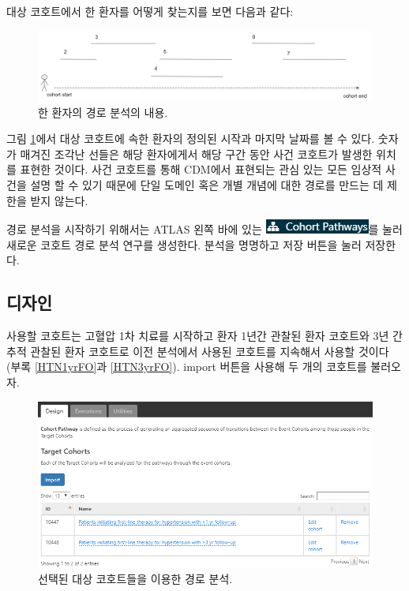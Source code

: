 \documentclass[11pt]{book}
\theoremstyle{definition}
\theoremstyle{definition}
\theoremstyle{definition}
\theoremstyle{remark}
\begin{document}
대상 코호트에서 한 환자를 어떻게 찾는지를 보면 다음과 같다:

\begin{figure}

{\centering \includegraphics[width=1\linewidth]{images/Characterization/pathwaysPersonEventView} 

}

\caption{한 환자의 경로 분석의 내용.}\label{fig:pathwaysPersonEventView}
\end{figure}

그림 \ref{fig:pathwaysPersonEventView}에서 대상 코호트에 속한 환자의
정의된 시작과 마지막 날짜를 볼 수 있다. 숫자가 매겨진 조각난 선들은 해당
환자에게서 해당 구간 동안 사건 코호트가 발생한 위치를 표현한 것이다.
사건 코호트를 통해 CDM에서 표현되는 관심 있는 모든 임상적 사건을 설명 할
수 있기 때문에 단일 도메인 혹은 개별 개념에 대한 경로를 만드는 데 제한을
받지 않는다.

경로 분석을 시작하기 위해서는 ATLAS 왼쪽 바에 있는
\includegraphics{images/Characterization/atlasPathwaysMenuItem.png}를
눌러 새로운 코호트 경로 분석 연구를 생성한다. 분석을 명명하고 저장
버튼을 눌러 저장한다.

\subsection{디자인}

사용할 코호트는 고혈압 1차 치료를 시작하고 환자 1년간 관찰된 환자
코호트와 3년 간 추적 관찰된 환자 코호트로 이전 분석에서 사용된 코호트를
지속해서 사용할 것이다 (부록 \ref{HTN1yrFO}과 \ref{HTN3yrFO}). import
버튼을 사용해 두 개의 코호트를 불러오자.

\begin{figure}

{\centering \includegraphics[width=1\linewidth]{images/Characterization/atlasPathwaysTargetCohorts} 

}

\caption{선택된 대상 코호트들을 이용한 경로 분석.}\label{fig:atlasPathwaysTargetCohorts}
\end{figure}
\end{document}
